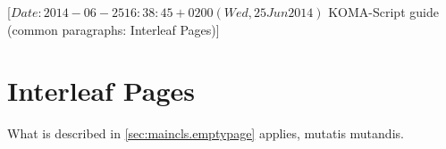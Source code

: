 %
%
%
%
%
%
%
%
% 
%
%
%
%

%
                 [$Date: 2014-06-25 16:38:45 +0200 (Wed, 25 Jun 2014) $
                  KOMA-Script guide (common paragraphs: Interleaf Pages)]


\makeatletter
{}%
%
%
%
\makeatother


\section{Interleaf Pages}
\label{sec:\csname label@base\endcsname.emptypage}%
\ifshortversion\IgnoreThisfalse{}\fi%
\ifIgnoreThis %
 What is described in
\autoref{sec:maincls.emptypage} applies, mutatis mutandis.
\else %
%

